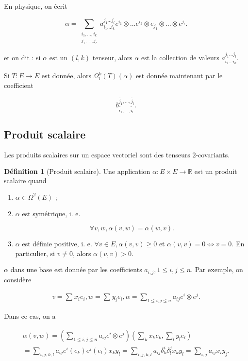 \documentclass[french]{article}
\theoremstyle{definition}
\newtheorem{protodefinition}{Définition}[section]
\newenvironment{definition}
    {\colorlet{shadecolor}{green!5}\begin{shaded}\begin{protodefinition}}
    {\end{protodefinition}\end{shaded}}
\theoremstyle{remark}
\newcommand{\biggg}{>}
\newcommand{\bg}{\biggg}
\begin{document}
En physique, on écrit

\[\alpha = \sum_{\substack{i_1, \dots, i_k \\ j_1, \dots, j_l}}^{} a _{i_1 \dots i_k} ^{j_1 \dots j_l} e ^{i_1} \otimes \dots e ^{i_k} \otimes e _{j_1} \otimes \dots \otimes e ^{j_l}. \]

et on dit : si \(\alpha\) est un \((l, k) \) tenseur, alors \(\alpha\) est la collection de valeurs \(a ^{j_1 \dots j_l} _{i_1 \dots i_k}\).


Si \(T : E \to E\) est donnée, alors \(\Omega ^{k} _{l}(T)(\alpha)\) est donnée maintenant par le coefficient

\[b _{\tilde{i_1}, \dots, \tilde{i_l}} ^{\tilde{j_1}, \dots, \tilde{j_l}}.\]

\subsection{Produit scalaire}

Les produits scalaires sur un espace vectoriel sont des tenseurs 2-covariants.

\begin{definition}[Produit scalaire]
  Une application \(\alpha : E \times E \to \mathbb{R}\) est un produit scalaire quand

  \begin{enumerate}
    \item \(\alpha \in \Omega ^{2}(E)\) ;
    \item \(\alpha\) est symétrique, i. e.

    \[\forall v, w, \alpha(v,w) = \alpha(w, v).\]

    \item \(\alpha\) est définie positive, i. e. \(\forall v \in E, \alpha(v, v) \geq  0\) et \(\alpha(v,v) = 0 \iff v=0\). En particulier, si \(v \neq 0\), alors \(\alpha(v,v) \bg 0\).
  \end{enumerate}

  \(\alpha\) dans une base est donnée par les coefficients \(a _{i, j}, 1 \leq  i,j \leq n\). Par exemple, on considère

  \begin{gather}
    v = \sum_{}^{} x_i e_i, w = \sum_{}^{} y_i e_i, \alpha = \sum_{1 \leq i,j \leq n}^{} a _{ij} e ^{i} \otimes e ^{j}.
  \end{gather}

  Dans ce cas, on a

  \begin{gather}
    \alpha(v,w) = \left(\sum_{1 \leq i,j \leq n}^{} a _{ij} e ^{i} \otimes e ^{j} \right) \left(\sum _{k} x_k e_k, \sum_{l}^{} y_l e_l\right) \\
    = \sum_{i,j,k,l}^{} a _{ij} e ^{i}(e_k) e ^{j}(e_l) x_k y_l   = \sum_{i,j,k,l}^{} a _{ij} \delta _{k} ^{i} \delta _{l} ^{j} x_k y_l   = \sum_{i,j}^{} a _{ij} x_i y_j.
  \end{gather}
\end{definition}
\end{document}
